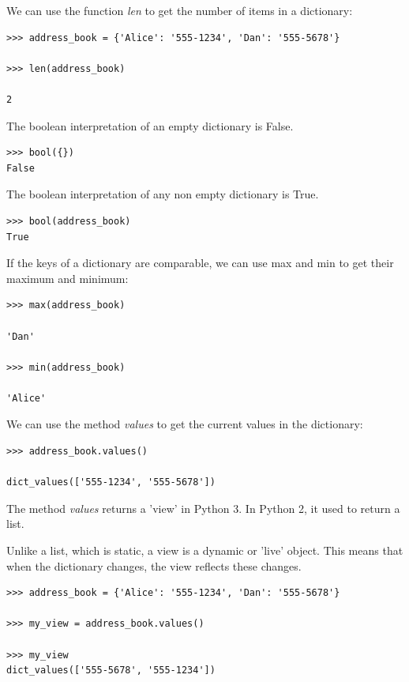 \documentclass{article}
\begin{document}
We can use the function \textit{len} to get the number of items in a dictionary:

\begin{lstlisting}
>>> address_book = {'Alice': '555-1234', 'Dan': '555-5678'}

>>> len(address_book)

2
\end{lstlisting}

The boolean interpretation of an empty dictionary is False.

\begin{lstlisting}
>>> bool({})
False 
\end{lstlisting}

The boolean interpretation of any non empty dictionary is True. 

\begin{lstlisting}
>>> bool(address_book)
True 
\end{lstlisting}

If the keys of a dictionary are comparable, we can use max and min to get their maximum and minimum:

\begin{lstlisting}
>>> max(address_book)

'Dan'

>>> min(address_book)

'Alice'
\end{lstlisting}

We can use the method \textit{values} to get the current values in the dictionary:

\begin{lstlisting}
>>> address_book.values()

dict_values(['555-1234', '555-5678'])
\end{lstlisting}

The method \textit{values} returns a 'view' in Python 3.  In Python 2, it used to return a list.

Unlike a list, which is static, a view is a dynamic or 'live' object.  This means that when the dictionary changes, the view reflects these changes.

\begin{lstlisting}
>>> address_book = {'Alice': '555-1234', 'Dan': '555-5678'}

>>> my_view = address_book.values()

>>> my_view
dict_values(['555-5678', '555-1234'])

\end{lstlisting}
\end{document}
